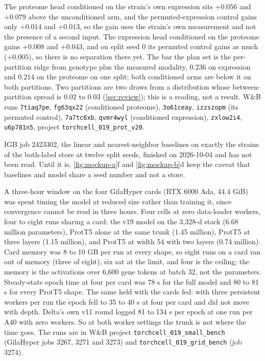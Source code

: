 The proteome head conditioned on the strain's own expression sits $+0.056$ and $+0.079$
above the unconditioned arm, and the permuted-expression control gains only $+0.014$ and
$+0.013$, so the gain uses the strain's own measurement and not the presence of a second
input. The expression head conditioned on the proteome gains $+0.008$ and $+0.043$, and on
split seed 0 its permuted control gains as much ($+0.005$), so there is no separation there
yet. The bar the plan set is the per-partition ridge from genotype plus the measured
modality, $0.236$ on expression and $0.214$ on the proteome on one split; both conditioned
arms are below it on both partitions. Two partitions are two draws from a distribution whose
between-partition spread is $0.02$ to $0.03$ (\cref{sec:review}); this is a reading, not a
result. W\&B runs \texttt{7tiaq7pe}, \texttt{fg63qx22} (conditioned proteome),
\texttt{3o61ceay}, \texttt{izzszopm} (its permuted control), \texttt{7a7tc6xb},
\texttt{qvmr4wyl} (conditioned expression), \texttt{zxlow2i4}, \texttt{u6p781n5}, project
\texttt{torchcell\_019\_prot\_v20}.

 IGB job 2423302, the linear
and nearest-neighbor baselines on exactly the strains of the both-label store at twelve
split seeds, finished on 2026-10-04 and has not been read. Until it is, \cref{fig:mockup-a}f
and \cref{fig:mockup-b}d keep the caveat that baselines and model share a seed number and
not a store.

 A three-hour window on the four GilaHyper
cards (RTX 6000 Ada, 44.4 GiB) was spent timing the model at reduced size rather than
training it, since convergence cannot be read in three hours. Four cells at zero
data-loader workers, four to eight runs sharing a card: the v19 model on the 3{,}328-d
stack (6.68 million parameters), ProtT5 alone at the same trunk (1.45 million), ProtT5 at
three layers (1.15 million), and ProtT5 at width 54 with two layers (0.74 million). Card
memory was 8 to 10 GB per run at every shape, so eight runs on a card ran out of memory
(three of eight), six sat at the limit, and four is the ceiling; the memory is the
activations over 6{,}600 gene tokens at batch 32, not the parameters. Steady-state epoch
time at four per card was 78 s for the full model and 80 to 81 s for every ProtT5 shape. The
same held with the cards fed: with three persistent workers per run the epoch fell to 35 to
40 s at four per card and did not move with depth. Delta's own v11 round logged 81 to 134 s
per epoch at one run per A40 with zero workers. So at both worker settings the trunk is not
where the time goes. The runs are in W\&B project \texttt{torchcell\_019\_small\_bench}
(GilaHyper jobs 3267, 3271 and 3273) and \texttt{torchcell\_019\_grid\_bench} (job 3274).

